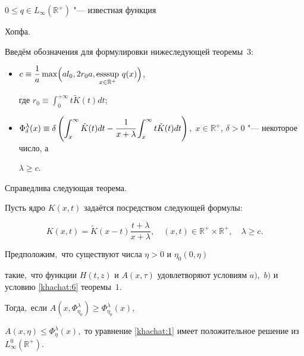 $0\leq q\in L_{\infty}(\mathbb{R}^+)$ "--- известная функция

Хопфа.



Введём обозначения для формулировки нижеследующей теоремы~3:



\begin{itemize}



\item[1)]

$\displaystyle c\equiv\frac{1}{a}\max\Bigl(al_0,2r_0a,\mathop{\rm esssup}\limits_{x\in\mathbb{R}^+}\,q(x)\Bigr)$,

где $\displaystyle  r_0\equiv\int _{0}^{+\infty}t\tilde{K}(t)dt$;



\item[2)] $\displaystyle  \Phi_{\delta}^{\lambda}(x)\equiv\delta

\left(\int _{x}^{\infty}\tilde{K}(t)dt-

\cfrac{1}{x+\lambda}\int _{x}^{\infty}t\tilde{K}(t)dt

\right),$  $x\in\mathbb{R}^+$, $\delta>0$ "--- некоторое число, а

$\lambda\geq c$.



\end{itemize}



Справедлива следующая теорема.



\smallskip

\begin{theorem}[3]Пусть ядро $K(x,t)$ задаётся посредством следующей формулы\/$:$

 \begin{equation}

K(x,t)=\tilde{K}(x-t)\frac{t+\lambda}{x+\lambda},\quad

(x,t)\in\mathbb{R}^+\times\mathbb{R}^+,\quad \lambda\geq

c.\label{khachat:22}

\end{equation}

Предположим$,$ что существуют числа $\eta>0$ и $\eta_0(0,\eta)$

такие$,$ что функции $H(t,z)$ и $A(x,\tau)$ удовлетворяют условиям $a),$ $b)$ и условию \eqref{khachat:6} теоремы~$1.$ 

Тогда$,$ если $A(x,\Phi_{\eta_0}^{\lambda})\geq \Phi_{\eta_0}^{\lambda}(x),$

$A(x,\eta)\leq\Phi_{\eta}^{\lambda}(x),$ то уравнение \eqref{khachat:1} имеет положительное решение из $L_{\infty}^0(\mathbb{R}^+).$

\end{theorem}



